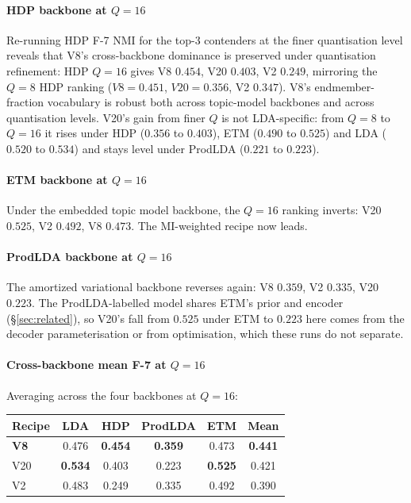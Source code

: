 \documentclass[journal,a4paper,10pt]{IEEEtran}
\begin{document}
\paragraph{HDP backbone at $Q=16$} Re-running HDP F-7 NMI for the
top-3 contenders at the finer quantisation level reveals that V8's
cross-backbone dominance is preserved under quantisation refinement:
HDP $Q=16$ gives V8 $0.454$, V20 $0.403$, V2 $0.249$, mirroring the
$Q=8$ HDP ranking ($V8 = 0.451$, $V20 = 0.356$, V2 $0.347$). V8's
endmember-fraction vocabulary is robust both across topic-model
backbones and across quantisation levels. V20's gain from finer $Q$
is not LDA-specific: from $Q=8$ to $Q=16$ it rises under HDP ($0.356$
to $0.403$), ETM ($0.490$ to $0.525$) and LDA ($0.520$ to $0.534$) and
stays level under ProdLDA ($0.221$ to $0.223$).

\paragraph{ETM backbone at $Q=16$} Under the embedded topic model
backbone, the $Q=16$ ranking inverts: V20 $0.525$, V2 $0.492$, V8
$0.473$. The MI-weighted recipe now leads.

\paragraph{ProdLDA backbone at $Q=16$} The amortized variational
backbone reverses again: V8 $0.359$, V2 $0.335$, V20 $0.223$. The
ProdLDA-labelled model shares ETM's prior and encoder
(\S\ref{sec:related}), so V20's fall from $0.525$ under ETM to $0.223$
here comes from the decoder parameterisation or from optimisation,
which these runs do not separate.

\paragraph{Cross-backbone mean F-7 at $Q=16$} Averaging across the
four backbones at $Q=16$:

\begin{center}
\small
\begin{tabular}{lcccc|c}
\toprule
Recipe & LDA & HDP & ProdLDA & ETM & \textbf{Mean} \\
\midrule
\textbf{V8}  & 0.476 & \textbf{0.454} & \textbf{0.359} & 0.473 & \textbf{0.441} \\
V20 & \textbf{0.534} & 0.403 & 0.223 & \textbf{0.525} & 0.421 \\
V2  & 0.483 & 0.249 & 0.335 & 0.492 & 0.390 \\
\bottomrule
\end{tabular}
\end{center}
\end{document}
